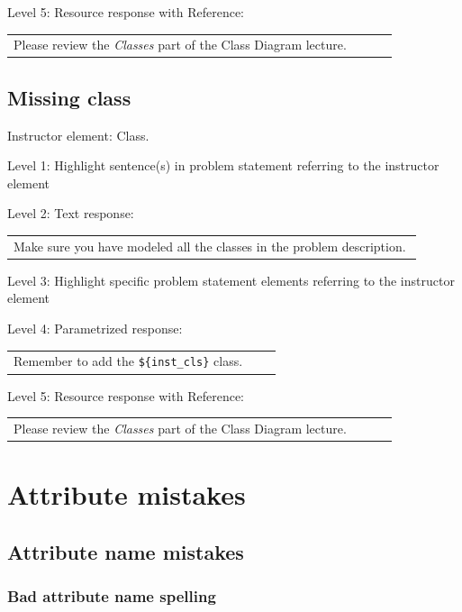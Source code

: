 \noindent Level 5: Resource response with Reference: \medskip

\begin{tabular}{|p{0.9\linewidth}}
Please review the \textit{Classes} part of the Class Diagram lecture.
\end{tabular} \medskip


\subsection{Missing class}

Instructor element: Class. \medskip

\noindent Level 1: Highlight sentence(s) in problem statement referring to the instructor element \medskip

\noindent Level 2: Text response: \medskip

\begin{tabular}{|p{0.9\linewidth}}
Make sure you have modeled all the classes in the problem description.
\end{tabular} \medskip

\noindent Level 3: Highlight specific problem statement elements referring to the instructor element \medskip

\noindent Level 4: Parametrized response: \medskip

\begin{tabular}{|p{0.9\linewidth}}
Remember to add the \verb|${inst_cls}| class.
\end{tabular} \medskip

\noindent Level 5: Resource response with Reference: \medskip

\begin{tabular}{|p{0.9\linewidth}}
Please review the \textit{Classes} part of the Class Diagram lecture.
\end{tabular} \medskip



\section{Attribute mistakes}

\subsection{Attribute name mistakes}

\subsubsection{Bad attribute name spelling}

